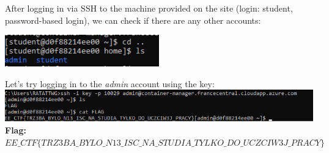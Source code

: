 \documentclass{article}
\begin{document}
\newpage
After logging in via SSH to the machine provided on the site (login: student, password-based login), we can check if there are any other accounts:
\begin{center}
    \includegraphics[width=0.5\textwidth]{"image63.png"}
\end{center}
Let’s try logging in to the \textit{admin} account using the key:
\vspace{3mm} \\
\includegraphics[width=\textwidth]{"image64.png"}
\textbf{Flag:} $ EE\_CTF\{TRZ3BA\_BYLO\_N13\_ISC\_NA\_STUDIA\_TYLKO\_DO\_UCZCIW3J\_PRACY\} $

\newpage
\end{document}

